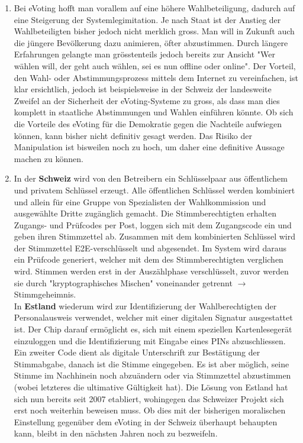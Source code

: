 \documentclass[a4paper]{article}
\begin{document}
	\begin{enumerate}
		\item Bei eVoting hofft man vorallem auf eine höhere Wahlbeteiligung, dadurch auf eine Steigerung der Systemlegimitation. Je nach Staat ist der Anstieg der Wahlbeteiligten bisher jedoch nicht merklich gross. Man will in Zukunft auch die jüngere Bevölkerung dazu animieren, öfter abzustimmen. Durch längere Erfahrungen gelangte man grösstenteils jedoch bereits zur Ansicht "Wer wählen will, der geht auch wählen, sei es nun offline oder online". Der Vorteil, den Wahl- oder Abstimmungsprozess mittels dem Internet zu vereinfachen, ist klar ersichtlich, jedoch ist beispielsweise in der Schweiz der landesweite Zweifel an der Sicherheit der eVoting-Systeme zu gross, als dass man dies komplett in staatliche Abstimmungen und Wahlen einführen könnte. Ob sich die Vorteile des eVoting für die Demokratie gegen die Nachteile aufwiegen können, kann bisher nicht definitiv gesagt werden. Das Risiko der Manipulation ist bisweilen noch zu hoch, um daher eine definitive Aussage machen zu können. 
		\item In der \textbf{Schweiz} wird von den Betreibern ein Schlüsselpaar aus öffentlichem und privatem Schlüssel erzeugt. Alle öffentlichen Schlüssel werden kombiniert und allein für eine Gruppe von Spezialisten der Wahlkommission und ausgewählte Dritte zugänglich gemacht. Die Stimmberechtigten erhalten Zugangs- und Prüfcodes per Post, loggen sich mit dem Zugangscode ein und geben ihren Stimmzettel ab. Zusammen mit dem kombinierten Schlüssel wird der Stimmzettel E2E-verschlüsselt und abgesendet. Im System wird daraus ein Prüfcode generiert, welcher mit dem des Stimmberechtigten verglichen wird. Stimmen werden erst in der Auszählphase verschlüsselt, zuvor werden sie durch "kryptographisches Mischen" voneinander getrennt $\rightarrow$  Stimmgeheimnis.\\
		In \textbf{Estland} wiederum wird zur Identifizierung der Wahlberechtigten der Personalausweis verwendet, welcher mit einer digitalen Signatur ausgestattet ist. Der Chip darauf ermöglicht es, sich mit einem speziellen Kartenlesegerät einzuloggen und die Identifizierung mit Eingabe eines PINs abzuschliessen. Ein zweiter Code dient als digitale Unterschrift zur Bestätigung der Stimmabgabe, danach ist die Stimme eingegeben. Es ist aber möglich, seine Stimme im Nachhinein noch abzuändern oder via Stimmzettel abzustimmen (wobei letzteres die ultimative Gültigkeit hat). Die Lösung von Estland hat sich nun bereits seit 2007 etabliert, wohingegen das Schweizer Projekt sich erst noch weiterhin beweisen muss. Ob dies mit der bisherigen moralischen Einstellung gegenüber dem eVoting in der Schweiz überhaupt behaupten kann, bleibt in den nächsten Jahren noch zu bezweifeln.
	\end{enumerate}
	
\end{document}
